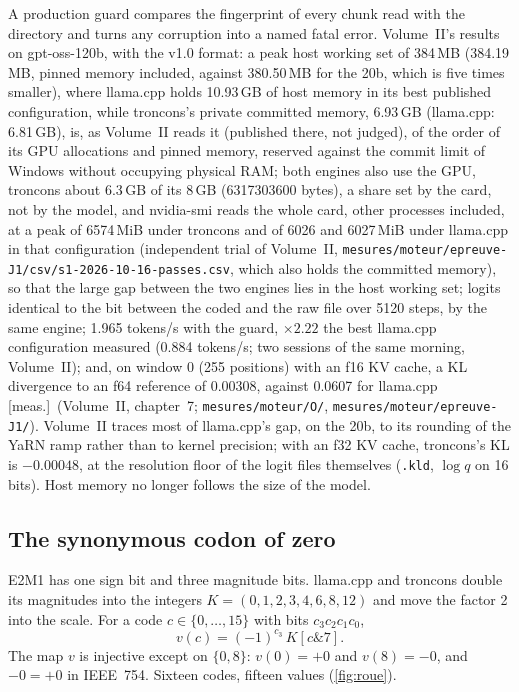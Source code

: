 \documentclass[11pt, a4paper]{article}
\theoremstyle{remark}
\newcommand{\etiq}[1]{\textsf{\scriptsize[#1]}}
\newcommand{\mes}{\etiq{meas.}}
\newcommand{\fichier}[1]{\textsf{\footnotesize\nolinkurl{#1}}}
\begin{document}
A production guard compares the fingerprint of every chunk read with the directory and turns any corruption into a named fatal error. Volume~II's results on gpt-oss-120b, with the v1.0 format: a peak host working set of 384\,MB (\num{384.19}\,MB, pinned memory included, against \num{380.50}\,MB for the 20b, which is five times smaller), where llama.cpp holds 10.93\,GB of host memory in its best published configuration, while troncons's private committed memory, 6.93\,GB (llama.cpp: 6.81\,GB), is, as Volume~II reads it (published there, not judged), of the order of its GPU allocations and pinned memory, reserved against the commit limit of Windows without occupying physical RAM; both engines also use the GPU, troncons about 6.3\,GB of its 8\,GB (\num{6317303600} bytes), a share set by the card, not by the model, and nvidia-smi reads the whole card, other processes included, at a peak of \num{6574}\,MiB under troncons and of \num{6026} and \num{6027}\,MiB under llama.cpp in that configuration (independent trial of Volume~II, \fichier{mesures/moteur/epreuve-J1/csv/s1-2026-10-16-passes.csv}, which also holds the committed memory), so that the large gap between the two engines lies in the host working set; logits identical to the bit between the coded and the raw file over \num{5120} steps, by the same engine; 1.965 tokens/s with the guard, $\times 2.22$ the best llama.cpp configuration measured (0.884 tokens/s; two sessions of the same morning, Volume~II); and, on window 0 (255 positions) with an f16 KV cache, a KL divergence to an f64 reference of 0.00308, against 0.0607 for llama.cpp \mes~(Volume~II, chapter~7; \fichier{mesures/moteur/O/}, \fichier{mesures/moteur/epreuve-J1/}). Volume~II traces most of llama.cpp's gap, on the 20b, to its rounding of the YaRN ramp \citep{peng2023yarn} rather than to kernel precision; with an f32 KV cache, troncons's KL is $-0.00048$, at the resolution floor of the logit files themselves (\texttt{.kld}, $\log q$ on 16 bits). Host memory no longer follows the size of the model.

\subsection{The synonymous codon of zero}\label{sec:codon}

E2M1 has one sign bit and three magnitude bits. llama.cpp and troncons double its magnitudes into the integers $K = (0, 1, 2, 3, 4, 6, 8, 12)$ and move the factor 2 into the scale. For a code $c \in \{0, \dots, 15\}$ with bits $c_3c_2c_1c_0$,
\begin{equation}\label{eq:valeur}
v(c) = (-1)^{c_3}\,K[c \mathbin{\&} 7].
\end{equation}
The map $v$ is injective except on $\{0, 8\}$: $v(0) = +0$ and $v(8) = -0$, and $-0 = +0$ in IEEE~754. Sixteen codes, fifteen values (\cref{fig:roue}).
\end{document}
